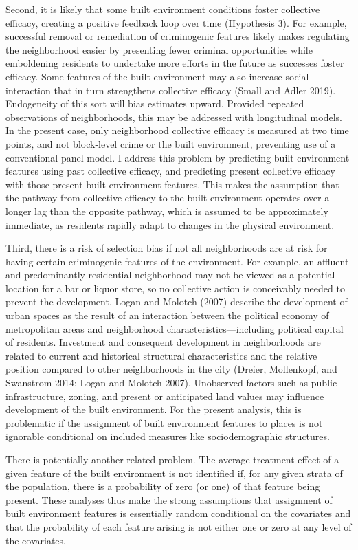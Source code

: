 \documentclass [11pt, proquest] {uwthesis}[2015/03/03]
\begin{document}
Second, it is likely that some built environment conditions foster collective efficacy, creating a positive feedback loop over time (Hypothesis 3). For example, successful removal or remediation of criminogenic features likely makes regulating the neighborhood easier by presenting fewer criminal opportunities while emboldening residents to undertake more efforts in the future as successes foster efficacy. Some features of the built environment may also increase social interaction that in turn strengthens collective efficacy (Small and Adler 2019). Endogeneity of this sort will bias estimates upward. Provided repeated observations of neighborhoods, this may be addressed with longitudinal models. In the present case, only neighborhood collective efficacy is measured at two time points, and not block-level crime or the built environment, preventing use of a conventional panel model. I address this problem by predicting built environment features using past collective efficacy, and predicting present collective efficacy with those present built environment features. This makes the assumption that the pathway from collective efficacy to the built environment operates over a longer lag than the opposite pathway, which is assumed to be approximately immediate, as residents rapidly adapt to changes in the physical environment.

Third, there is a risk of selection bias if not all neighborhoods are at risk for having certain criminogenic features of the environment. For example, an affluent and predominantly residential neighborhood may not be viewed as a potential location for a bar or liquor store, so no collective action is conceivably needed to prevent the development. Logan and Molotch (2007) describe the development of urban spaces as the result of an interaction between the political economy of metropolitan areas and neighborhood characteristics---including political capital of residents. Investment and consequent development in neighborhoods are related to current and historical structural characteristics and the relative position compared to other neighborhoods in the city (Dreier, Mollenkopf, and Swanstrom 2014; Logan and Molotch 2007). Unobserved factors such as public infrastructure, zoning, and present or anticipated land values may influence development of the built environment. For the present analysis, this is problematic if the assignment of built environment features to places is not ignorable conditional on included measures like sociodemographic structures.

There is potentially another related problem. The average treatment effect of a given feature of the built environment is not identified if, for any given strata of the population, there is a probability of zero (or one) of that feature being present. These analyses thus make the strong assumptions that assignment of built environment features is essentially random conditional on the covariates and that the probability of each feature arising is not either one or zero at any level of the covariates.
\end{document}
